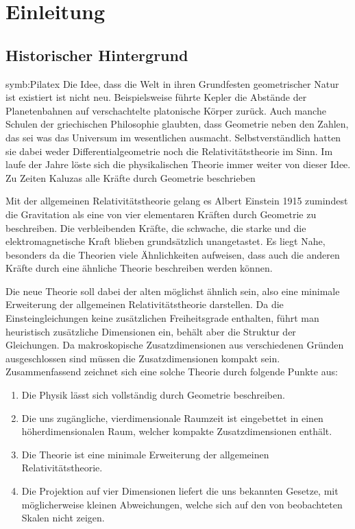 \chapter{Einleitung}
\section{Historischer Hintergrund}
\gls{symb:Pi}\gls{latex}
Die Idee, dass die Welt in ihren Grundfesten geometrischer Natur ist
existiert ist nicht neu.
Beispielsweise führte Kepler die Abstände der Planetenbahnen auf
verschachtelte platonische Körper zurück. Auch manche Schulen der griechischen
Philosophie glaubten, dass Geometrie neben den Zahlen, das sei was das Universum
im wesentlichen ausmacht.
Selbstverständlich hatten sie dabei weder Differentialgeometrie noch die 
Relativitätstheorie im Sinn.  
Im laufe der Jahre löste sich die physikalischen Theorie immer weiter von dieser Idee. 
Zu Zeiten Kaluzas alle Kräfte durch Geometrie beschrieben
 

Mit der allgemeinen Relativitätstheorie gelang es Albert Einstein 1915
zumindest die Gravitation als eine von vier elementaren Kräften durch Geometrie
zu beschreiben. Die verbleibenden Kräfte, die schwache, die starke und die elektromagnetische Kraft
blieben grundsätzlich unangetastet. Es liegt Nahe, besonders da die Theorien
viele Ähnlichkeiten aufweisen, dass auch die anderen Kräfte durch eine ähnliche
Theorie beschreiben werden können.

Die neue Theorie soll dabei der alten 
möglichst ähnlich sein, also eine minimale Erweiterung der allgemeinen
Relativitätstheorie darstellen.
Da die Einsteingleichungen keine
zusätzlichen Freiheitsgrade enthalten, führt man heuristisch zusätzliche
Dimensionen ein, behält aber die Struktur der Gleichungen.
Da makroskopische Zusatzdimensionen aus verschiedenen Gründen ausgeschlossen
sind müssen die Zusatzdimensionen kompakt sein.
Zusammenfassend zeichnet sich eine solche Theorie durch folgende Punkte aus:
\begin{enumerate} 
\item Die Physik lässt sich vollständig durch Geometrie beschreiben.
\item Die uns zugängliche, vierdimensionale Raumzeit ist eingebettet in einen
höherdimensionalen Raum, welcher kompakte Zusatzdimensionen enthält.
\item Die Theorie ist eine minimale Erweiterung der allgemeinen
Relativitätstheorie.
\item Die Projektion auf vier Dimensionen liefert die uns bekannten Gesetze, mit
möglicherweise kleinen Abweichungen, welche sich auf den von beobachteten Skalen
nicht zeigen.
\end{enumerate}